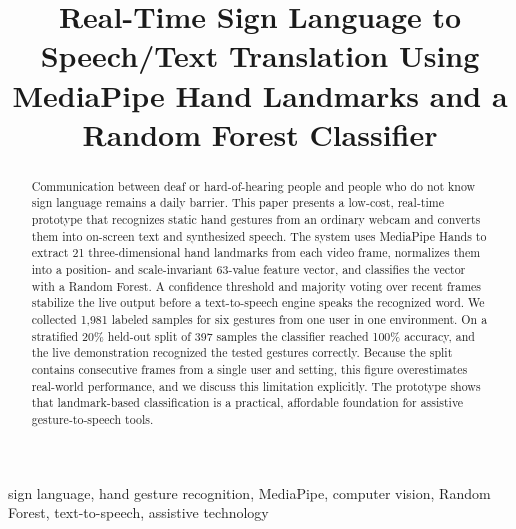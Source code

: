 \documentclass[conference]{IEEEtran}
\begin{document}
\title{Real-Time Sign Language to Speech/Text Translation Using MediaPipe Hand Landmarks and a Random Forest Classifier}

\author{
\and
{}
}

\maketitle

\begin{abstract}
Communication between deaf or hard-of-hearing people and people who do not know sign language remains a daily barrier. This paper presents a low-cost, real-time prototype that recognizes static hand gestures from an ordinary webcam and converts them into on-screen text and synthesized speech. The system uses MediaPipe Hands to extract 21 three-dimensional hand landmarks from each video frame, normalizes them into a position- and scale-invariant 63-value feature vector, and classifies the vector with a Random Forest. A confidence threshold and majority voting over recent frames stabilize the live output before a text-to-speech engine speaks the recognized word. We collected 1,981 labeled samples for six gestures from one user in one environment. On a stratified 20\% held-out split of 397 samples the classifier reached 100\% accuracy, and the live demonstration recognized the tested gestures correctly. Because the split contains consecutive frames from a single user and setting, this figure overestimates real-world performance, and we discuss this limitation explicitly. The prototype shows that landmark-based classification is a practical, affordable foundation for assistive gesture-to-speech tools.
\end{abstract}

\begin{IEEEkeywords}
sign language, hand gesture recognition, MediaPipe, computer vision, Random Forest, text-to-speech, assistive technology
\end{IEEEkeywords}
\end{document}
